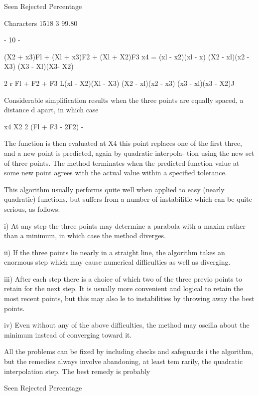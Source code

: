                  Seen Rejected  Percentage
 
Characters       1518        3   99.80
 
                            - 10 -
 
 
            (X2 + x3)Fl      +     (Xl + x3)F2      +      (Xl + X2)F3
  x4 =  (xl - x2)(xl - x)      (X2 - xl)(x2 - X3)      (X3 - Xl)(X3- X2)
 
              2 r Fl         +          F2          +          F3
        L(xl - X2)(Xl - X3)     (X2 - xl)(x2 - x3)     (x3 - xl)(x3 - X2)J
 
 
Considerable simplification results when the three points are equally
spaced, a distance d apart, in which case
 
 
                    x4   X2   2 (Fl + F3 - 2F2) -
 
 
The function is then evaluated at X4 this point replaces one of the
first three, and a new point is predicted, again by quadratic interpola-
tion using the new set of three points.  The method terminates when the
predicted function value at some new point agrees with the actual value
within a specified tolerance.
 
     This algorithm usually performs quite well when applied to easy
(nearly quadratic) functions, but suffers from a number of instabilitie
which can be quite serious, as follows:
 
  i) At any step the three points may determine a parabola with a maxim
     rather than a minimum, in which case the method diverges.
 
 ii) If the three points lie nearly in a straight line, the algorithm
     takes an enormous step which may cause numerical difficulties as
     well as diverging.
 
iii) After each step there is a choice of which two of the three previo
     points to retain for the next step.  It is usually more convenient
     and logical to retain the most recent points, but this may also le
     to instabilities by throwing away the best points.
 
 iv) Even without any of the above difficulties, the method may oscilla
     about the minimum instead of converging toward it.
 
     All the problems can be fixed by including checks and safeguards i
the algorithm, but the remedies always involve abandoning, at least tem
rarily, the quadratic interpolation step.  The best remedy is probably
 
                 Seen Rejected  Percentage
 
